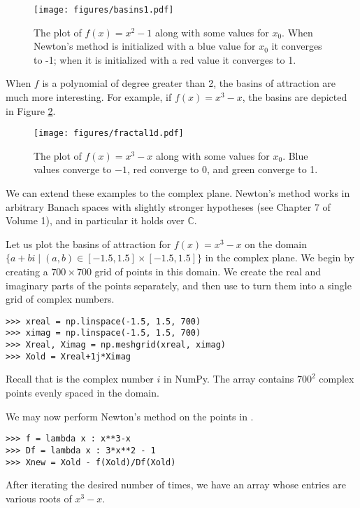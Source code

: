 \begin{figure}
    \centering
    \texttt{[image: figures/basins1.pdf]}
    \caption{The plot of $f(x) = x^2 -1$ along with some values for $x_0$.
    When Newton's method is initialized with a blue value for $x_0$ it converges to -1; when it is initialized with a red value it converges to 1.}
    \label{fig:basins1}
\end{figure}

When $f$ is a polynomial of degree greater than 2, the basins of attraction are much more interesting.
For example, if $f(x) = x^3-x$, the basins are depicted in Figure \ref{fig:fractal_1d}.

\begin{figure}
    \centering
    \texttt{[image: figures/fractal1d.pdf]}
    \caption{The plot of $f(x) = x^3 -x$ along with some values for $x_0$.
    Blue values converge to $-1$, red converge to 0, and green converge to 1.}
    \label{fig:fractal_1d}
\end{figure}

We can extend these examples to the complex plane.
Newton's method works in arbitrary Banach spaces with slightly stronger hypotheses (see Chapter 7 of Volume 1), and in particular it holds over $\mathbb{C}$.

Let us plot the basins of attraction for $f(x) = x^3-x$ on the domain $\{a+bi \mid (a, b) \in [-1.5, 1.5] \times [-1.5, 1.5] \}$ in the complex plane.
We begin by creating a $700 \times 700$ grid of points in this domain.
We create the real and imaginary parts of the points separately, and then use  to turn them into a single grid of complex numbers.

\begin{lstlisting}
>>> xreal = np.linspace(-1.5, 1.5, 700)
>>> ximag = np.linspace(-1.5, 1.5, 700)
>>> Xreal, Ximag = np.meshgrid(xreal, ximag)
>>> Xold = Xreal+1j*Ximag
\end{lstlisting}

Recall that  is the complex number $i$ in NumPy.
The array  contains $700^2$ complex points evenly spaced in the domain.

We may now perform Newton's method on the points in .

\begin{lstlisting}
>>> f = lambda x : x**3-x
>>> Df = lambda x : 3*x**2 - 1
>>> Xnew = Xold - f(Xold)/Df(Xold)
\end{lstlisting}

After iterating the desired number of times, we have an array  whose entries are various roots of $x^3-x$.


